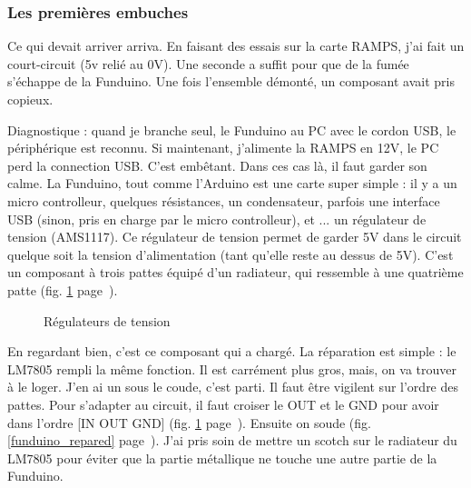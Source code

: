 \subsubsection{Les premières embuches}
Ce qui devait arriver arriva. En faisant des essais sur la carte RAMPS, j'ai fait un %
court-circuit (5v relié au 0V). Une seconde a suffit pour que de la fumée s'échappe %
de la Funduino. Une %
fois l'ensemble démonté, un composant avait pris copieux. \par %
Diagnostique : quand je branche seul, le Funduino au PC avec le cordon USB, le %
périphérique est reconnu. Si maintenant, j'alimente la RAMPS en 12V, le PC perd la %
connection USB. C'est embêtant. Dans ces cas là, il faut garder son calme. La %
Funduino, tout comme l'Arduino est une carte super simple : il y a un micro controlleur, %
quelques résistances, un condensateur, parfois une interface USB (sinon, pris en charge %
par le micro controlleur), et ... un régulateur de tension (AMS1117). Ce régulateur de %
tension permet de garder 5V dans le circuit quelque soit la tension d'alimentation (tant %
qu'elle reste au dessus de 5V). C'est un composant à trois pattes équipé d'un radiateur, qui %
ressemble à une quatrième patte (fig. \ref{regulator} page~\pageref{regulator}). %
\begin{figure}%
   \caption{\label{regulator} Régulateurs de tension}%
\end{figure}%
En regardant bien, c'est ce composant qui a chargé. %
La réparation est simple : le LM7805 rempli la même fonction. Il est carrément plus gros, %
mais, on va trouver à le loger. J'en ai un sous le coude, c'est parti. Il faut être %
vigilent sur l'ordre des pattes. Pour s'adapter au circuit, il faut croiser le OUT %
et le GND pour avoir dans l'ordre [IN OUT GND] (fig. \ref{regulator} page~\pageref{regulator}). Ensuite on soude (fig. \ref{funduino_repared} %
page~\pageref{funduino_repared}). J'ai pris soin de mettre un scotch sur le radiateur du %
LM7805 pour éviter que la partie métallique ne touche une autre partie de la Funduino.\par{} %
